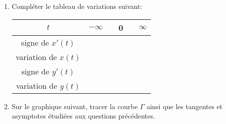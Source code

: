 \documentclass[a4paper]{tp_um}
\begin{document}
\begin{enumerate}
		\item Compléter le tableau de variations suivant:
			\begin{center}
				\begin{tabular}{|c|ccccc|}
					\hline    $t$       & $-\infty$ & \hspace{5cm}   &  0 &  \hspace{5cm} & $\infty$ \\[0.3cm]\hline\hline
					signe de $x'(t)$    &           &                &    &                 &          \\[0.4cm]\hline
       			 variation de $x(t)$    &           &                &    &                 &     	 \\[0.9cm]\hline\hline
					signe de $y'(t)$    &           &                &    &                 &          \\[0.4cm]\hline
					variation de $y(t)$ &           &                &    &                 &          \\[0.9cm]\hline
				\end{tabular}
			\end{center}
                        \vfill
		\item  Sur le graphique suivant, tracer la courbe $\Gamma$ ainsi que les tangentes et asymptotes étudiées aux questions précédentes. 
				\begin{center}
			\end{center}



	\end{enumerate}
 
\end{document}
